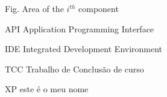 \begin{siglas}
  \item[Fig.] Area of the $i^{th}$ component
  \item[API] Application Programming Interface 
  \item[IDE] Integrated Development Environment 
  \item[TCC] Trabalho de Conclusão de curso
  \item[XP] este é o meu nome
\end{siglas}


